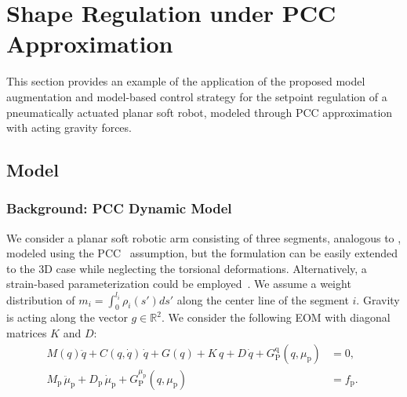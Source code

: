 \section{Shape Regulation under PCC Approximation}
%
This section provides an example of the application of the proposed model augmentation and model-based control strategy for the setpoint regulation of a pneumatically actuated planar soft robot, modeled through \gls{PCC} approximation with acting gravity forces. 

\subsection{Model}\label{sub:backstepping:pcc_model}
\subsubsection{Background: PCC Dynamic Model}
We consider a planar soft robotic arm consisting of three segments, analogous to \citep{della2020model}, modeled using the \gls{PCC}~\citep{jones2006kinematics} assumption, but the formulation can be easily extended to the 3D case while neglecting the torsional deformations. Alternatively, a strain-based parameterization could be employed~\citep{boyer2020dynamics}. 
We assume a weight distribution of $m_i = \int_{0}^{l_i} \rho_i(s') ds'$ along the center line of the segment $i$. Gravity is acting along the vector $g \in \mathbb{R}^2$. We consider the following \gls{EOM} with diagonal matrices $K$ and $D$:
\begin{equation}\label{eq:backstepping:dynamics_pcc_case}
\begin{split}
	M(q)\ddot{q} + C(q,\dot{q}) \, \dot{q} + G(q) + K \, q + D \, \dot{q} + G_{\mathrm{P}}^{\mathrm{q}}(q,\mu_\mathrm{p}) &= 0, \\
	M_\mathrm{p} \, \ddot{\mu}_\mathrm{p} + D_\mathrm{p} \, \dot{\mu}_\mathrm{p} + G_{\mathrm{P}}^{\mu_\mathrm{p}}(q,\mu_\mathrm{p}) &= f_\mathrm{p}. \; 
\end{split}
\end{equation}

